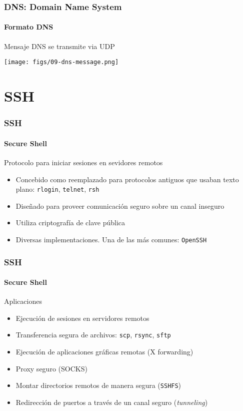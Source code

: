 \documentclass[letter]{beamer}
\begin{document}
\begin{frame}
  \frametitle{DNS: Domain Name System}
  \framesubtitle{Formato DNS}

  Mensaje DNS se transmite via UDP
  
  \begin{center}
    \texttt{[image: figs/09-dns-message.png]}
  \end{center}

\end{frame}

\section{SSH}
\begin{frame}
  \frametitle{SSH}
  \framesubtitle{Secure Shell}
  
  Protocolo para iniciar sesiones en sevidores remotos
  \begin{itemize}
    \item Concebido como reemplazado para protocolos antiguos que usaban texto plano: {\tt rlogin}, {\tt telnet}, {\tt rsh}
    \item Diseñado para proveer comunicación seguro sobre un canal inseguro
    \item Utiliza criptografía de clave pública
    \item Diversas implementaciones. Una de las más comunes: {\tt OpenSSH}    
  \end{itemize}
\end{frame}
\begin{frame}
  \frametitle{SSH}
  \framesubtitle{Secure Shell}

  Aplicaciones  
  \begin{itemize}
    \item Ejecución de sesiones en servidores remotos
    \item Transferencia segura de archivos: {\tt scp}, {\tt rsync}, {\tt sftp}
    \item Ejecución de aplicaciones gráficas remotas (X forwarding)
    \item Proxy seguro (SOCKS)
    \item Montar directorios remotos de manera segura ({\tt SSHFS})
    \item Redirección de puertos a través de un canal seguro ({\em tunneling})
  \end{itemize}
\end{frame}
\end{document}
